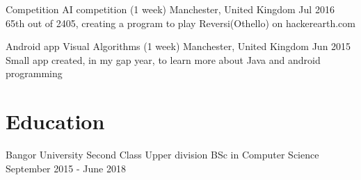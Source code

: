 \documentclass{my_cv}
\begin{document}
\experianceDetails
{Competition}
{AI competition}
{(1 week)}
{Manchester, United Kingdom}
{Jul 2016}
\workdetails
{65th out of 2405, creating a program to play Reversi(Othello) on hackerearth.com}
\stopworkdetails

\experianceDetails
{Android app}
{Visual Algorithms}
{(1 week)}
{Manchester, United Kingdom}
{Jun 2015}
\workdetails
{Small app created, in my gap year, to learn more about Java and android programming}
\stopworkdetails





\section{Education}
\educationDetails
{Bangor University}
{Second Class Upper division BSc in Computer Science}
{September 2015 - June 2018}
\medskip



%
%
%
%
%
%
%

\end{document}
